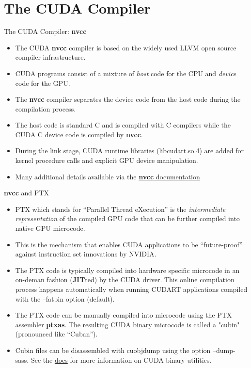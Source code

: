 \documentclass[handout]{beamer}
\begin{document}
\section{The CUDA Compiler}
\begin{frame}{The CUDA Compiler:  \textbf{{\selectfont nvcc}}}
\begin{itemize}
	\item<1->The CUDA \textbf{{\selectfont nvcc}} compiler is based on the widely used LLVM open source compiler infrastructure.
	\item<2->CUDA programs consist of a mixture of \emph{host} code for the CPU and \emph{device} code for the GPU.
	\item<3->The \textbf{{\selectfont nvcc}} compiler separates the device code from the host code during the compilation process.  
	\item<4->The host code is standard C and is compiled with C compilers while the CUDA C device code is compiled by \textbf{{\selectfont nvcc}}.
	\item<5->During the link stage, CUDA runtime libraries (libcudart.so.4) are added for kernel procedure calls and explicit GPU device manipulation. 
	\item<6->Many additional details available via the \href{http://docs.nvidia.com/cuda/cuda-compiler-driver-nvcc}{\color{blue}\textbf{{\selectfont nvcc}} documentation}  
\end{itemize}
\end{frame}

\begin{frame}{\textbf{{\selectfont nvcc}} and PTX}
\begin{itemize}
	\item<1->PTX which stands for ``Parallel Thread eXecution'' is the \emph{intermediate representation} of the compiled GPU code that can be further compiled into native GPU microcode.
	\item<2->This is the mechanism that enables CUDA applications to be ``future-proof'' against instruction set innovations by NVIDIA.
	\item<3->The PTX code is typically compiled into hardware specific microcode in an on-deman fashion (\textbf{JIT}ted) by the CUDA driver.  This online compilation process happens automatically when running CUDART applications compiled with the {\selectfont --fatbin} option (default).
	\item<4->The PTX code can be manually compiled into microcode using the PTX assembler \textbf{{\selectfont ptxas}}.  The resulting CUDA binary microcode is called a "cubin" (pronounced like ``Cuban'').
	\item<5-> Cubin files can be disassembled with {\selectfont cuobjdump} using the option {\selectfont --dump-sass}.  See the \href{http://docs.nvidia.com/cuda/cuda-binary-utilities}{\color{blue}docs} for more information on CUDA binary utilities.
\end{itemize}
\end{frame}
\end{document}
